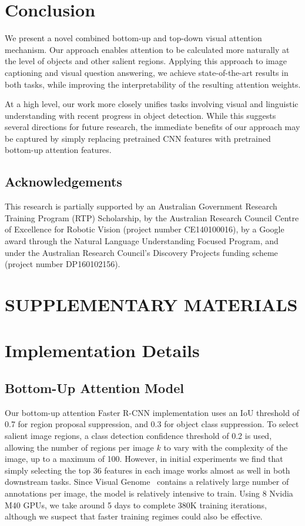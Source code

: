 \documentclass[10pt,twocolumn,letterpaper]{article}
\begin{document}
\section{Conclusion}

We present a novel combined bottom-up and top-down visual attention mechanism. Our approach enables attention to be calculated more naturally at the level of objects and other salient regions. Applying this approach to image captioning and visual question answering, we achieve state-of-the-art results in both tasks, while improving the interpretability of the resulting attention weights. 

At a high level, our work more closely unifies tasks involving visual and linguistic understanding with recent progress in object detection. While this suggests several directions for future research, the immediate benefits of our approach may be captured by simply replacing pretrained CNN features with pretrained bottom-up attention features.  

\subsection*{Acknowledgements}
\small
\noindent
This research is partially supported by an Australian Government Research Training Program (RTP) Scholarship, by the Australian Research Council Centre of Excellence for Robotic Vision (project number CE140100016), by a Google award through the Natural Language Understanding Focused Program, and under the Australian Research Council’s Discovery Projects funding scheme (project number DP160102156).


{\small


}

\newpage

\section*{SUPPLEMENTARY MATERIALS}

\section{Implementation Details}

\subsection{Bottom-Up Attention Model}

Our bottom-up attention Faster R-CNN implementation uses an IoU threshold of 0.7 for region proposal suppression, and 0.3 for object class suppression. To select salient image regions, a class detection confidence threshold of 0.2 is used, allowing the number of regions per image $k$ to vary with the complexity of the image, up to a maximum of 100. However, in initial experiments we find that simply selecting the top 36 features in each image works almost as well in both downstream tasks. Since Visual Genome~\cite{krishnavisualgenome} contains a relatively large number of annotations per image, the model is relatively intensive to train. Using 8 Nvidia M40 GPUs, we take around 5 days to complete 380K training iterations, although we suspect that faster training regimes could also be effective.
\end{document}
